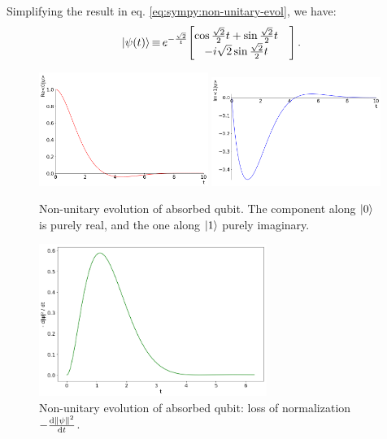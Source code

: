 Simplifying the result in eq. \eqref{eq:sympy:non-unitary-evol}, we have:
\begin{equation}
  \ket{\psi(t)} \repr e^{-\frac{\sqrt{2}}{t}} \mqty[
    \cos{\frac{\sqrt{2}}{2}t} + \sin{\frac{\sqrt{2}}{2}t}& \\
                     -i\sqrt{2} \sin{\frac{\sqrt{2}}{2}t}&
  ] \,\text{.}
\end{equation}

\begin{figure}
  \centering
  \includegraphics[width=0.49\textwidth]{img/2ldetect/re_psi0_t.png}
  \includegraphics[width=0.49\textwidth]{img/2ldetect/im_psi1_t.png}
  \caption{
    Non-unitary evolution of absorbed qubit.
    The component along $\ket{0}$ is purely real,
    and the one along $\ket{1}$ purely imaginary.
  }
  \label{fig:absorbed-qubit-components}
\end{figure}

\begin{figure}
  \centering
  \includegraphics[width=0.66\textwidth]{img/2ldetect/qubit_normalization_loss.png}
  \caption{
    Non-unitary evolution of absorbed qubit: loss of normalization $-\dv{\norm{\psi}^2}{t}$.
  }
  \label{fig:absorbed-qubit-normalization-loss}
\end{figure}

